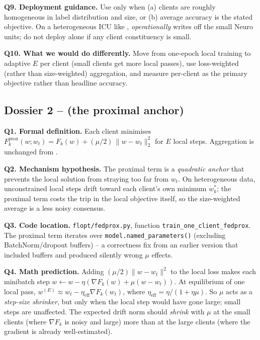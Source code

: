 \textbf{Q9. Deployment guidance.}
Use \fedavg{} only when (a) clients are roughly homogeneous in label
distribution and size, or (b) average accuracy is the stated
objective. On a heterogeneous ICU like \mimic{}, \fedavg{}
\emph{operationally} writes off the small Neuro units; do not deploy
\fedavg{} alone if any client constituency is small.

\textbf{Q10. What we would do differently.}
Move from one-epoch local training to adaptive $E$ per client (small
clients get more local passes), use loss-weighted (rather than
size-weighted) aggregation, and measure per-client \auprc{} as the
primary objective rather than headline accuracy.

\subsection{Dossier 2 -- \fedprox{} (the proximal anchor)}
\label{sec:dossier-fedprox}

\textbf{Q1. Formal definition.}
Each client minimises
$F_k^{\mathrm{prox}}(w; w_t) = F_k(w) + (\mu/2)\, \|w - w_t\|_2^2$ for
$E$ local steps. Aggregation is unchanged from \fedavg{}.

\textbf{Q2. Mechanism hypothesis.}
The proximal term is a \emph{quadratic anchor} that prevents the local
solution from straying too far from $w_t$. On heterogeneous data,
unconstrained local steps drift toward each client's own minimum
$w_k^*$; the proximal term costs the trip in the local objective
itself, so the size-weighted average is a less noisy consensus.

\textbf{Q3. Code location.} \texttt{flopt/fedprox.py}, function
\texttt{train\_one\_client\_fedprox}. The proximal term iterates over
\texttt{model.named\_parameters()} (excluding BatchNorm/dropout
buffers) -- a correctness fix from an earlier version that included
buffers and produced silently wrong $\mu$ effects.

\textbf{Q4. Math prediction.}
Adding $(\mu/2)\|w - w_t\|^2$ to the local loss makes each minibatch
step
$w \!\leftarrow\! w - \eta(\nabla F_k(w) + \mu(w - w_t))$.
At equilibrium of one local pass,
$w^{(E)} \!\approx\! w_t - \eta_{\mathrm{eff}} \nabla F_k(w_t)$,
where $\eta_{\mathrm{eff}} \!=\! \eta/(1 + \eta\mu)$. So $\mu$ acts as
a \emph{step-size shrinker}, but only when the local step would have
gone large; small steps are unaffected. The expected drift norm should
\emph{shrink} with $\mu$ at the small clients (where $\nabla F_k$ is
noisy and large) more than at the large clients (where the gradient is
already well-estimated).

